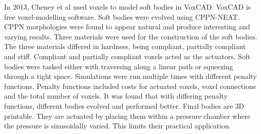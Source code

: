 In 2013, Cheney et al used voxels to model soft bodies in VoxCAD. VoxCAD is free voxel-modelling software. Soft bodies were evolved using CPPN-NEAT. CPPN morphologies were found to appear natural and produce interesting and varying results. Three materials were used for the construction of the soft bodies. The three materials differed in hardness, being compliant, partially compliant and stiff. Compliant and partially compliant voxels acted as the actuators. Soft bodies were tasked either with traversing along a linear path or squeezing through a tight space. Simulations were run multiple times with different penalty functions. Penalty functions included costs for actuated voxels, voxel connections and the total number of voxels. It was found that with differing penalty functions, different bodies evolved and performed better. Final bodies are 3D printable. They are actuated by placing them within a pressure chamber where the pressure is sinusoidally varied. This limits their practical application. \cite{Cheney2013a,Cheney2015}